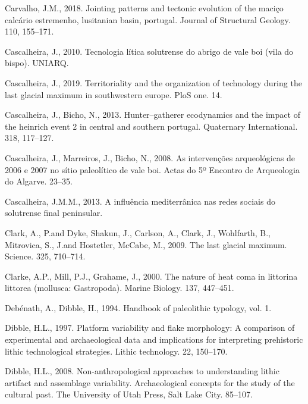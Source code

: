 \documentclass[12pt,twoside]{reedthesis}
\begin{document}
\leavevmode\hypertarget{ref-carvalho2018}{}%
Carvalho, J.M., 2018. Jointing patterns and tectonic evolution of the maciço calcário estremenho, lusitanian basin, portugal. Journal of Structural Geology. 110, 155--171.

\leavevmode\hypertarget{ref-cascalheira2010}{}%
Cascalheira, J., 2010. Tecnologia lítica solutrense do abrigo de vale boi (vila do bispo). UNIARQ.

\leavevmode\hypertarget{ref-cascalheira2019}{}%
Cascalheira, J., 2019. Territoriality and the organization of technology during the last glacial maximum in southwestern europe. PloS one. 14.

\leavevmode\hypertarget{ref-cascalheiraandbicho2013}{}%
Cascalheira, J., Bicho, N., 2013. Hunter--gatherer ecodynamics and the impact of the heinrich event 2 in central and southern portugal. Quaternary International. 318, 117--127.

\leavevmode\hypertarget{ref-cascalheiraetal2008}{}%
Cascalheira, J., Marreiros, J., Bicho, N., 2008. As intervenções arqueológicas de 2006 e 2007 no sítio paleolítico de vale boi. Actas do 5º Encontro de Arqueologia do Algarve. 23--35.

\leavevmode\hypertarget{ref-cascalheira2013}{}%
Cascalheira, J.M.M., 2013. A influência mediterrânica nas redes sociais do solutrense final peninsular.

\leavevmode\hypertarget{ref-clark2009}{}%
Clark, A., P.and Dyke, Shakun, J., Carlson, A., Clark, J., Wohlfarth, B., Mitrovica, S., J.and Hostetler, McCabe, M., 2009. The last glacial maximum. Science. 325, 710--714.

\leavevmode\hypertarget{ref-clarke2000}{}%
Clarke, A.P., Mill, P.J., Grahame, J., 2000. The nature of heat coma in littorina littorea (mollusca: Gastropoda). Marine Biology. 137, 447--451.

\leavevmode\hypertarget{ref-debenath1994}{}%
Debénath, A., Dibble, H., 1994. Handbook of paleolithic typology, vol. 1.

\leavevmode\hypertarget{ref-dibble1997}{}%
Dibble, H.L., 1997. Platform variability and flake morphology: A comparison of experimental and archaeological data and implications for interpreting prehistoric lithic technological strategies. Lithic technology. 22, 150--170.

\leavevmode\hypertarget{ref-dibble2008}{}%
Dibble, H.L., 2008. Non-anthropological approaches to understanding lithic artifact and assemblage variability. Archaeological concepts for the study of the cultural past. The University of Utah Press, Salt Lake City. 85--107.
\end{document}
